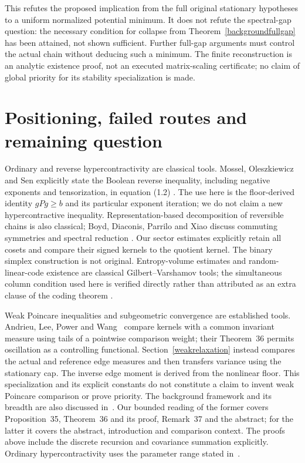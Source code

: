\documentclass[11pt]{article}
\begin{document}
This refutes the proposed implication from the full original stationary
hypotheses to a uniform normalized potential minimum. It does not
refute the spectral-gap question: the necessary condition for collapse
from Theorem~\ref{backgroundfullgap} has been attained, not shown
sufficient. Further full-gap arguments must control the actual chain
without deducing such a minimum. The finite reconstruction is an
analytic existence proof, not an executed matrix-scaling certificate;
no claim of global priority for its stability specialization is made.

\section{Positioning, failed routes and remaining question}
Ordinary and reverse hypercontractivity are classical tools. Mossel, Oleszkiewicz and Sen explicitly state the Boolean reverse inequality, including negative exponents and tensorization, in equation (1.2) \cite{mos}. The use here is the floor-derived identity $gPg\geq b$ and its particular exponent iteration; we do not claim a new hypercontractive inequality. Representation-based decomposition of reversible chains is also classical; Boyd, Diaconis, Parrilo and Xiao discuss commuting symmetries and spectral reduction \cite{boyd}. Our sector estimates explicitly retain all cosets and compare their signed kernels to the quotient kernel. The binary simplex construction is not original. Entropy-volume estimates and random-linear-code existence are classical Gilbert--Varshamov tools; the simultaneous column condition used here is verified directly rather than attributed as an extra clause of the coding theorem \cite{guruswami}.

Weak Poincare inequalities and subgeometric convergence are established tools.
Andrieu, Lee, Power and Wang~\cite{alpw2022} compare kernels with a common
invariant measure using tails of a pointwise comparison weight; their
Theorem~36 permits oscillation as a controlling functional. Section~\ref{weakrelaxation}
instead compares the actual and reference edge measures and then transfers
variance using the stationary cap. The inverse edge moment is derived from
the nonlinear floor. This specialization and its explicit constants do not
constitute a claim to invent weak Poincare comparison or prove priority.
The background framework and its breadth are also discussed in~\cite{alpw2023}.
Our bounded reading of the former covers Proposition~35, Theorem~36 and its
proof, Remark~37 and the abstract; for the latter it covers the abstract,
introduction and comparison context. The proofs above include the discrete
recursion and covariance summation explicitly. Ordinary hypercontractivity
uses the parameter range stated in~\cite{odonnelllecture}.
\end{document}
